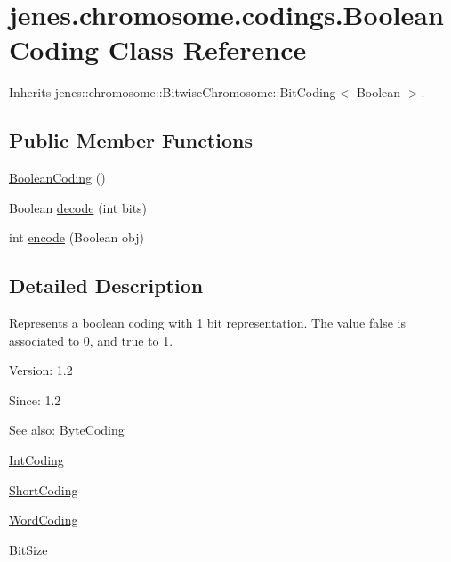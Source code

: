 \hypertarget{classjenes_1_1chromosome_1_1codings_1_1_boolean_coding}{
\section{jenes.chromosome.codings.BooleanCoding Class Reference}
\label{classjenes_1_1chromosome_1_1codings_1_1_boolean_coding}
}
Inherits jenes::chromosome::BitwiseChromosome::BitCoding$<$ Boolean $>$.

\subsection*{Public Member Functions}
\begin{CompactItemize}
\item 
\hyperlink{classjenes_1_1chromosome_1_1codings_1_1_boolean_coding_3a8318406c4a080fa5b39899de1831df}{BooleanCoding} ()
\item 
Boolean \hyperlink{classjenes_1_1chromosome_1_1codings_1_1_boolean_coding_38188e39066ecd06e4c839bced2038d3}{decode} (int bits)
\item 
int \hyperlink{classjenes_1_1chromosome_1_1codings_1_1_boolean_coding_ce4181a4ef8bf37d9ad762d15422527b}{encode} (Boolean obj)
\end{CompactItemize}


\subsection{Detailed Description}
Represents a boolean coding with 1 bit representation. The value false is associated to 0, and true to 1.

\begin{Desc}
\item[Version:]1.2 \end{Desc}
\begin{Desc}
\item[Since:]1.2\end{Desc}
\begin{Desc}
\item[See also:]\hyperlink{classjenes_1_1chromosome_1_1codings_1_1_byte_coding}{ByteCoding} 

\hyperlink{classjenes_1_1chromosome_1_1codings_1_1_int_coding}{IntCoding} 

\hyperlink{classjenes_1_1chromosome_1_1codings_1_1_short_coding}{ShortCoding} 

\hyperlink{classjenes_1_1chromosome_1_1codings_1_1_word_coding}{WordCoding} 

BitSize \end{Desc}


